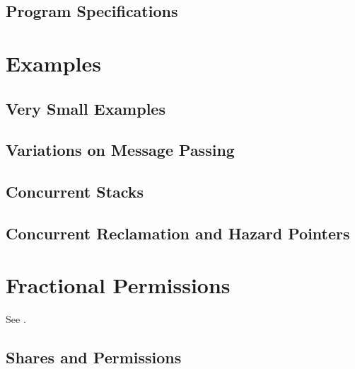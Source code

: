 \documentclass[11pt]{report}
\begin{document}



\section{Program Specifications} %
\label{sec:program_specifications}


\chapter{Examples}

\section{Very Small Examples} %

\label{sec:very_small_examples}


\section{Variations on Message Passing} %
\label{sec:variations_on_message_passing}


\section{Concurrent Stacks} %
\label{sec:concurrent_stacks}


\section{Concurrent Reclamation and Hazard Pointers} %
\label{sec:hazard_pointers}


\chapter{Fractional Permissions}

See \cite{lola11}. 

\section{Shares and Permissions} %
\label{sec:permissions}
\end{document}
